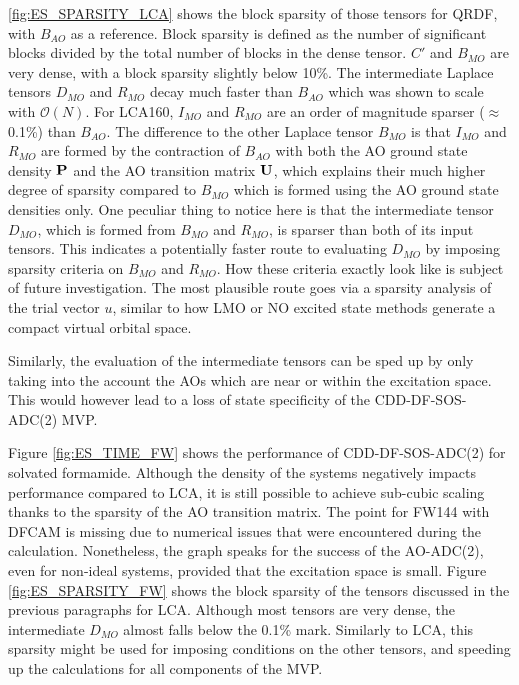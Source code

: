 \ref{fig:ES_SPARSITY_LCA} shows the block sparsity of those tensors for QRDF, with $B_{AO}$ as a reference. Block sparsity is defined as the number of significant blocks divided by the total number of blocks in the dense tensor. $C'$ and $B_{MO}$ are very dense, with a block sparsity slightly below 10\%. The intermediate Laplace tensors $D_{MO}$ and $R_{MO}$ decay much faster than $B_{AO}$ which was shown to scale with $\mathcal{O}(N)$. For LCA160, $I_{MO}$ and $R_{MO}$ are an order of magnitude sparser ($\approx$ 0.1\%) than $B_{AO}$. The difference to the other Laplace tensor $B_{MO}$ is that $I_{MO}$ and $R_{MO}$ are formed by the contraction of $B_{AO}$ with both the AO ground state density $\mathbf{P}$ and the AO transition matrix $\mathbf{U}$, which explains their much higher degree of sparsity compared to $B_{MO}$ which is formed using the AO ground state densities only. One peculiar thing to notice here is that the intermediate tensor $D_{MO}$, which is formed from $B_{MO}$ and $R_{MO}$, is sparser than both of its input tensors. This indicates a potentially faster route to evaluating $D_{MO}$ by imposing sparsity criteria on $B_{MO}$ and $R_{MO}$. How these criteria exactly look like is subject of future investigation. The most plausible route goes via a sparsity analysis of the trial vector $u$, similar to how LMO or NO excited state methods generate a compact virtual orbital space.



Similarly, the evaluation of the intermediate tensors can be sped up by only taking into the account the AOs which are near or within the excitation space. This would however lead to a loss of state specificity of the CDD-DF-SOS-ADC(2) MVP. 

Figure \ref{fig:ES_TIME_FW} shows the performance of CDD-DF-SOS-ADC(2) for solvated formamide. Although the density of the systems negatively impacts performance compared to LCA, it is still possible to achieve sub-cubic scaling thanks to the sparsity of the AO transition matrix. The point for FW144 with DFCAM is missing due to numerical issues that were encountered during the calculation. Nonetheless, the graph speaks for the success of the AO-ADC(2), even for non-ideal systems, provided that the excitation space is small. Figure \ref{fig:ES_SPARSITY_FW} shows the block sparsity of the tensors discussed in the previous paragraphs for LCA. Although most tensors are very dense, the intermediate $D_{MO}$ almost falls below the 0.1\% mark. Similarly to LCA, this sparsity might be used for imposing conditions on the other tensors, and speeding up the calculations for all components of the MVP. 

